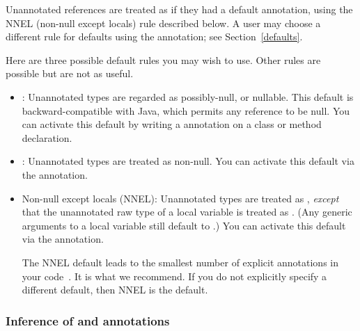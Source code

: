 Unannotated references are treated as if they had a default annotation,
using the NNEL (non-null except locals) rule described below.
A user may choose a different rule for defaults using the 
 annotation; see
Section~\ref{defaults}.

\begin{sloppy}
Here are three possible default rules you may wish to use.  Other rules are
possible but are not as useful.
\begin{itemize}
\item
  :  Unannotated types are regarded as possibly-null, or
  nullable.  This default is backward-compatible with Java, which permits
  any reference to be null.  You can activate this default by writing
  a  annotation on a
  class or method
  declaration.
\item
  :  Unannotated types are treated as non-null.
  You can activate this
  default via the
   annotation.
\item
  Non-null except locals (NNEL):  Unannotated types are treated as
  , \emph{except} that the unannotated raw type of a local
  variable is treated as .  (Any generic arguments to a
  local variable still default to .)  You can activate this
  default via the  annotation.

  The NNEL default leads to the smallest number of explicit annotations in
  your code~\cite{PapiACPE2008}.  It is what we recommend.  If you do not
  explicitly specify a different default, then NNEL is the default.
\end{itemize}
\end{sloppy}



\subsubsection{Inference of  and  annotations\label{nullness-inference}}

